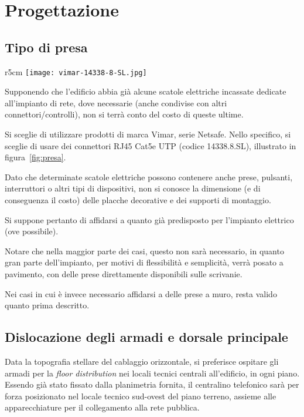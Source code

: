 %

\newpage
\section{Progettazione}
\subsection{Tipo di presa}

\begin{wrapfigure}{r}{5cm}
  \centering
  \texttt{[image: vimar-14338-8-SL.jpg]}
  \caption{Il connettore scelto per le prese utente.}\label{fig:presa}
\end{wrapfigure}

Supponendo che l'edificio abbia già alcune scatole elettriche incassate dedicate all'impianto di rete,
dove necessarie (anche condivise con altri connettori/controlli), non si terrà conto del costo di queste ultime.

Si sceglie di utilizzare prodotti di marca Vimar, serie Netsafe.
Nello specifico, si sceglie di usare dei connettori RJ45 Cat5e UTP (codice 14338.8.SL), illustrato in figura~\ref{fig:presa}.

Dato che determinate scatole elettriche possono contenere anche prese, pulsanti, interruttori o altri tipi
di dispositivi, non si conosce la dimensione (e di conseguenza il costo) delle placche decorative e dei supporti di montaggio.

Si suppone pertanto di affidarsi a quanto già predisposto per l'impianto elettrico (ove possibile).

Notare che nella maggior parte dei casi, questo non sarà necessario, in quanto gran parte dell'impianto,
per motivi di flessibilità e semplicità, verrà posato a pavimento, con delle prese direttamente disponibili sulle scrivanie.

Nei casi in cui è invece necessario affidarsi a delle prese a muro, resta valido quanto prima descritto.

\subsection{Dislocazione degli armadi e dorsale principale}

Data la topografia stellare del cablaggio orizzontale, si preferisce ospitare gli armadi per la \textit{floor distribution}
nei locali tecnici centrali all'edificio, in ogni piano. Essendo già stato fissato dalla planimetria fornita, il centralino
telefonico sarà per forza posizionato nel locale tecnico sud-ovest del piano terreno, assieme alle apparecchiature per
il collegamento alla rete pubblica.

